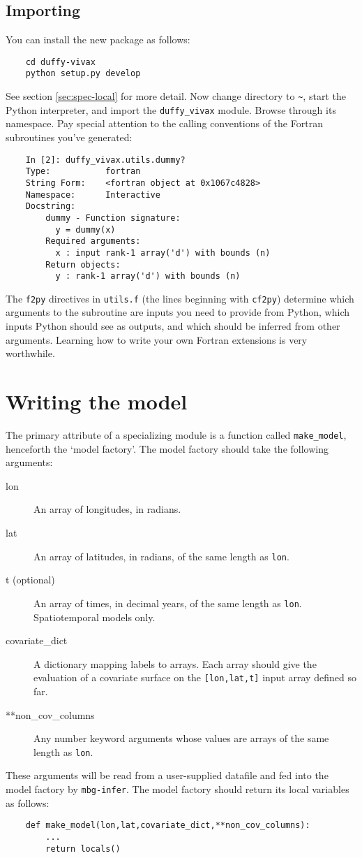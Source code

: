 \subsection{Importing}
You can install the new package as follows:
\begin{verbatim}
    cd duffy-vivax
    python setup.py develop
\end{verbatim}
See section \ref{sec:spec-local} for more detail. Now change directory to \texttt{\~}, start the Python interpreter, and import the \texttt{duffy\_vivax} module. Browse through its namespace. Pay special attention to the calling conventions of the Fortran subroutines you've generated:
\begin{verbatim}
    In [2]: duffy_vivax.utils.dummy?
    Type:           fortran
    String Form:    <fortran object at 0x1067c4828>
    Namespace:      Interactive
    Docstring:
        dummy - Function signature:
          y = dummy(x)
        Required arguments:
          x : input rank-1 array('d') with bounds (n)
        Return objects:
          y : rank-1 array('d') with bounds (n)
\end{verbatim}
The \texttt{f2py} directives in \texttt{utils.f} (the lines beginning with \texttt{cf2py}) determine which arguments to the subroutine are inputs you need to provide from Python, which inputs Python should see as outputs, and which should be inferred from other arguments. Learning how to write your own Fortran extensions is very worthwhile.

\section{Writing the model}

The primary attribute of a specializing module is a function called \texttt{make\_model}, henceforth the `model factory'. The model factory should take the following arguments:
\begin{description}
    \item[lon] An array of longitudes, in radians.
    \item[lat] An array of latitudes, in radians, of the same length as \texttt{lon}.
    \item[t (optional)] An array of times, in decimal years, of the same length as \texttt{lon}. Spatiotemporal models only.
    \item[covariate\_dict] A dictionary mapping labels to arrays. Each array should give the evaluation of a covariate surface on the \texttt{[lon,lat,t]} input array defined so far.
    \item[**non\_cov\_columns] Any number keyword arguments whose values are arrays of the same length as \texttt{lon}.
\end{description}
These arguments will be read from a user-supplied datafile and fed into the model factory by \texttt{mbg-infer}. The model factory should return its local variables as follows: 
\begin{verbatim}
    def make_model(lon,lat,covariate_dict,**non_cov_columns):
        ...
        return locals()
\end{verbatim}


